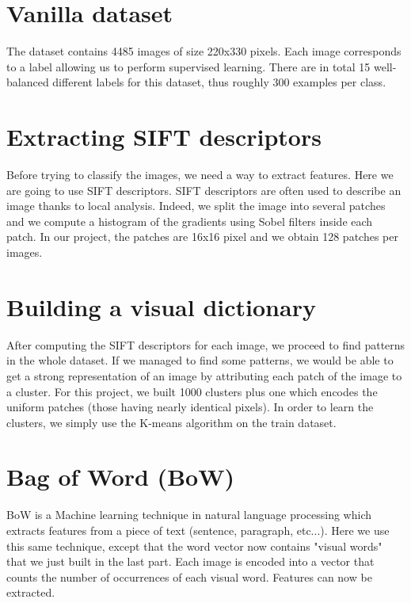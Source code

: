 \section{Vanilla dataset}

The dataset contains 4485 images of size 220x330 pixels. Each image corresponds to a label allowing us to perform supervised learning. There are in total 15 well-balanced different labels for this dataset, thus roughly 300 examples per class.

\section{Extracting SIFT descriptors}

Before trying to classify the images, we need a way to extract features. Here we are going to use SIFT descriptors. SIFT descriptors are often used to describe an image thanks to local analysis. Indeed, we split the image into several patches and we compute a histogram of the gradients using Sobel filters inside each patch. In our project, the patches are 16x16 pixel and we obtain 128 patches per images.

\section{Building a visual dictionary}

After computing the SIFT descriptors for each image, we proceed to find patterns in the whole dataset. If we managed to find some patterns, we would be able to get a strong representation of an image by attributing each patch of the image to a cluster. For this project, we built 1000 clusters plus one which encodes the uniform patches (those having nearly identical pixels). In order to learn the clusters, we simply use the K-means algorithm on the train dataset.

\section{Bag of Word (BoW)}

BoW is a Machine learning technique in natural language processing which extracts features from a piece of text (sentence, paragraph, etc...). Here we use this same technique, except that the word vector now contains "visual words" that we just built in the last part. Each image is encoded into a vector that counts the number of occurrences of each visual word. Features can now be extracted.

